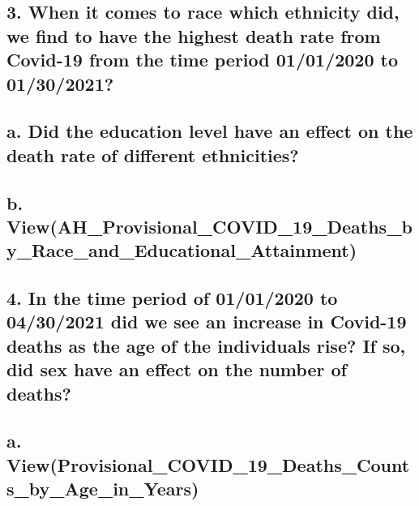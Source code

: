 \documentclass[
]{article}
\begin{document}
\hypertarget{when-it-comes-to-race-which-ethnicity-did-we-find-to-have-the-highest-death-rate-from-covid-19-from-the-time-period-01012020-to-01302021}{%
\subsection{3. When it comes to race which ethnicity did, we find to
have the highest death rate from Covid-19 from the time period
01/01/2020 to
01/30/2021?}\label{when-it-comes-to-race-which-ethnicity-did-we-find-to-have-the-highest-death-rate-from-covid-19-from-the-time-period-01012020-to-01302021}}

\hypertarget{a.-did-the-education-level-have-an-effect-on-the-death-rate-of-different-ethnicities}{%
\subsection{a. Did the education level have an effect on the death rate
of different
ethnicities?}\label{a.-did-the-education-level-have-an-effect-on-the-death-rate-of-different-ethnicities}}

\hypertarget{b.-viewah_provisional_covid_19_deaths_by_race_and_educational_attainment}{%
\subsection{b.
View(AH\_Provisional\_COVID\_19\_Deaths\_by\_Race\_and\_Educational\_Attainment)}\label{b.-viewah_provisional_covid_19_deaths_by_race_and_educational_attainment}}

\hypertarget{in-the-time-period-of-01012020-to-04302021-did-we-see-an-increase-in-covid-19-deaths-as-the-age-of-the-individuals-rise-if-so-did-sex-have-an-effect-on-the-number-of-deaths}{%
\subsection{4. In the time period of 01/01/2020 to 04/30/2021 did we see
an increase in Covid-19 deaths as the age of the individuals rise? If
so, did sex have an effect on the number of
deaths?}\label{in-the-time-period-of-01012020-to-04302021-did-we-see-an-increase-in-covid-19-deaths-as-the-age-of-the-individuals-rise-if-so-did-sex-have-an-effect-on-the-number-of-deaths}}

\hypertarget{a.-viewprovisional_covid_19_deaths_counts_by_age_in_years}{%
\subsection{a.
View(Provisional\_COVID\_19\_Deaths\_Counts\_by\_Age\_in\_Years)}\label{a.-viewprovisional_covid_19_deaths_counts_by_age_in_years}}
\end{document}
